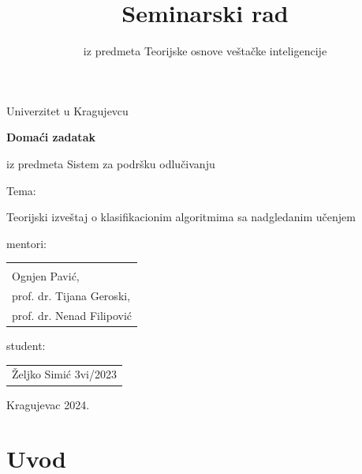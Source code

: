 \documentclass[fontsize=12bp, paper=a4]{scrarticle}
\title{Seminarski rad}
\subtitle{iz predmeta Teorijske osnove veštačke inteligencije}
\begin{document}
\begin{titlepage}
    
    \begin{center}
        
        \vspace*{8cm}
        
        \large{Univerzitet u Kragujevcu}
        
        \vspace*{1cm}

        {\bfseries \LARGE Domaći zadatak}
        
        \large{iz predmeta Sistem za podršku odlučivanju}
        
        \vspace*{1cm}
        \large{Tema:}

        \Large{Teorijski izveštaj o klasifikacionim algoritmima sa nadgledanim učenjem}


        \vspace*{2cm}
    \end{center}
    \hfill{\parbox[s]{8cm}{

    mentori: 
    \begin{tabular}{l}
        \\
        \\
        Ognjen Pavić, \\
        prof. dr. Tijana Geroski, \\
        prof. dr. Nenad Filipović 
    \end{tabular}
    
    student: \begin{tabular}{l}
        Željko Simić 3vi/2023
    \end{tabular}
    }}

    \hspace*{\fill} 

    \vspace*{2cm}

    \begin{center}
        Kragujevac 2024.
    \end{center}
\end{titlepage}


\setcounter{page}{1}
\justifying
\linespread{1}
\cfoot[\pagemark]{\pagemark}
\ofoot[]{}
\chead[]{}
%
\justify

\section{Uvod}
\end{document}
